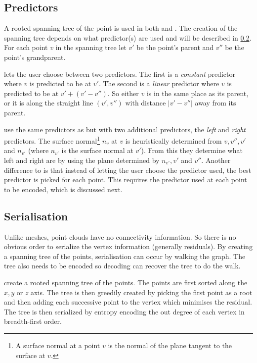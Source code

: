 \documentclass[a4paper]{report}
\begin{document}
\subsection{Predictors}

A rooted spanning tree of the point is used in both \citet{gumholdcomp} and
\citet{merrycomp}. The creation of the spanning tree depends on what
predictor(s) are used and will be described in \ref{sec:serialisation}. For
each point $v$ in the spanning tree let $v'$ be the point's parent and $v''$
be the point's grandparent.

\citet{gumholdcomp} lets the user choose between two predictors. The first is
a \emph{constant} predictor where $v$ is predicted to be at $v'$. The second
is a \emph{linear} predictor where $v$ is predicted to be at $v' + (v' -
v'')$. So either $v$ is in the same place as its parent, or it is along the
straight line $(v', v'')$ with distance $|v'-v''|$ away from its parent.

\citet{merrycomp} use the same predictors as \citet{gumholdcomp} but with two
additional predictors, the \emph{left} and \emph{right} predictors. The
surface normal\footnote{A surface normal at a point $v$ is the normal of the
  plane tangent to the surface at $v$.} $n_v$ at $v$ is heuristically
determined from $v, v'', v'$ and $n_{v'}$ (where $n_{v'}$ is the surface
normal at $v'$). From this they determine what left and right are by using the
plane determined by $n_{v'}, v'$ and $v''$. Another difference to
\citet{gumholdcomp} is that instead of letting the user choose the
predictor used, the best predictor is picked for each point. This requires the
predictor used at each point to be encoded, which is discussed next.


\subsection{Serialisation}
\label{sec:serialisation}

Unlike meshes, point clouds have no connectivity information. So there is no
obvious order to serialize the vertex information (generally residuals). By
creating a spanning tree of the points, serialisation can occur by walking the
graph. The tree also needs to be encoded so decoding can recover the tree to
do the walk.

\citet{gumholdcomp} create a rooted spanning tree of the points. The points
are first sorted along the $x, y$ or $z$ axis. The tree is then greedily
created by picking the first point as a root and then adding each successive
point to the vertex which minimises the residual. The tree is then serialized
by entropy encoding the out degree of each vertex in breadth-first order.
\end{document}
